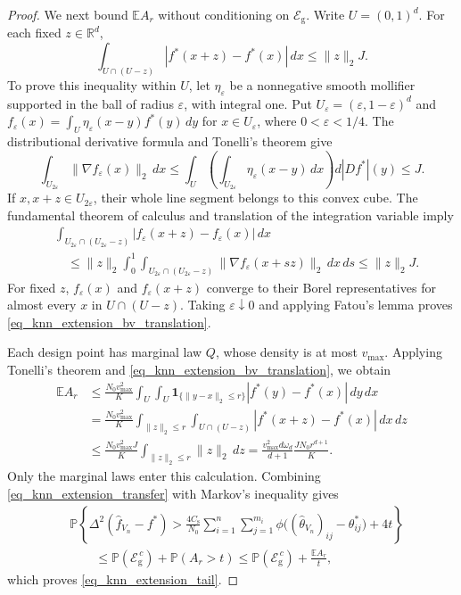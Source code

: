 \documentclass[twoside,11pt]{article}
\newenvironment{revision}{\color{revisionred}}{}
\begin{document}
\begin{revision}
\begin{proof}
We next bound $\mathbb E A_r$ without conditioning on
$\mathcal E_{\mathrm g}$.
Write $U=(0,1)^d$. For each fixed $z\in\mathbb R^d$,
\begin{equation}
\label{eq_knn_extension_bv_translation}
\int_{U\cap(U-z)}|f^*(x+z)-f^*(x)|\,dx
\leq \|z\|_2J.
\end{equation}
To prove this inequality within $U$, let $\eta_\varepsilon$ be a
nonnegative smooth mollifier supported in the ball of radius
$\varepsilon$, with integral one. Put
$U_\varepsilon=(\varepsilon,1-\varepsilon)^d$ and
$f_\varepsilon(x)=\int_U\eta_\varepsilon(x-y)f^*(y)\,dy$
for $x\in U_\varepsilon$, where $0<\varepsilon<1/4$.
The distributional derivative formula and Tonelli's theorem give
\[
\int_{U_{2\varepsilon}}\|\nabla f_\varepsilon(x)\|_2\,dx
\leq
\int_U\left(
\int_{U_{2\varepsilon}}\eta_\varepsilon(x-y)\,dx
\right)d|Df^*|(y)
\leq J.
\]
If $x,x+z\in U_{2\varepsilon}$, their whole line segment
belongs to this convex cube. The fundamental theorem of calculus
and translation of the integration variable imply
\begin{align*}
&\int_{U_{2\varepsilon}\cap(U_{2\varepsilon}-z)}
|f_\varepsilon(x+z)-f_\varepsilon(x)|\,dx\\
&\quad\leq
\|z\|_2\int_0^1
\int_{U_{2\varepsilon}\cap(U_{2\varepsilon}-z)}
\|\nabla f_\varepsilon(x+sz)\|_2\,dx\,ds
\leq \|z\|_2J.
\end{align*}
For fixed $z$, $f_\varepsilon(x)$ and
$f_\varepsilon(x+z)$ converge to their Borel representatives
for almost every $x$ in $U\cap(U-z)$.
Taking $\varepsilon\downarrow0$ and applying Fatou's lemma proves
\eqref{eq_knn_extension_bv_translation}.

Each design point has marginal law $Q$, whose density is at most
$v_{\max}$. Applying Tonelli's theorem and
\eqref{eq_knn_extension_bv_translation}, we obtain
\begin{align*}
\mathbb E A_r
&\leq
\frac{N_0v_{\max}^2}{K}
\int_U\int_U
\mathbf1_{\{\|y-x\|_2\leq r\}}
|f^*(y)-f^*(x)|\,dy\,dx\\
&=
\frac{N_0v_{\max}^2}{K}
\int_{\|z\|_2\leq r}
\int_{U\cap(U-z)}
|f^*(x+z)-f^*(x)|\,dx\,dz\\
&\leq
\frac{N_0v_{\max}^2J}{K}
\int_{\|z\|_2\leq r}\|z\|_2\,dz
=\frac{v_{\max}^2d\omega_d}{d+1}
\frac{J N_0r^{d+1}}{K}.
\end{align*}
Only the marginal laws enter this calculation.
Combining \eqref{eq_knn_extension_transfer} with Markov's
inequality gives
\begin{align*}
&\mathbb P\left\{
\Delta^2(\hat f_{V_n}-f^*)>
\frac{4C_{\mathrm s}}{N_0}\sum_{i=1}^n\sum_{j=1}^{m_i}
\phi\bigl((\hat\theta_{V_n})_{ij}-\theta^*_{ij}\bigr)+4t
\right\}\\
&\qquad\leq
\mathbb P(\mathcal E_{\mathrm g}^{\,c})
+\mathbb P(A_r>t)
\leq
\mathbb P(\mathcal E_{\mathrm g}^{\,c})
+\frac{\mathbb E A_r}{t},
\end{align*}
which proves \eqref{eq_knn_extension_tail}.


\end{proof}
\end{revision}
\end{document}
